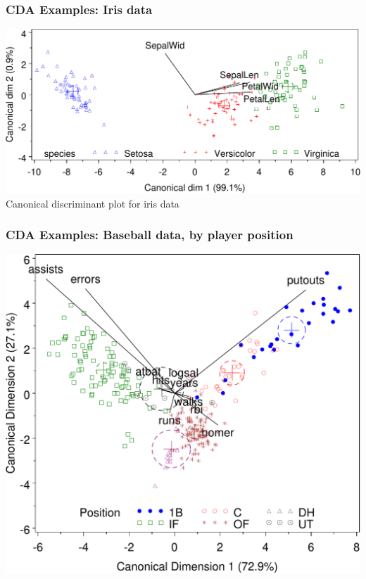 \begin{frame}
  \frametitle{CDA Examples: Iris data}
\begin{center}
  \includegraphics[width=.85\textwidth,clip]{fig/gcaniris}
  \\ Canonical discriminant plot for iris data
\end{center}

\end{frame}

\begin{frame}
  \frametitle{CDA Examples: Baseball data, by player position}
\begin{center}
  \includegraphics[width=.75\textwidth,clip]{fig/gcanbase}
\end{center}

\end{frame}


